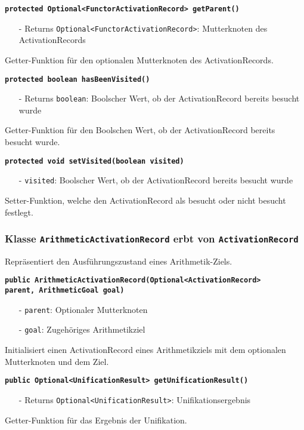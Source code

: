 \documentclass[parskip=full,11pt,twoside]{scrartcl}
\begin{document}
\textbf{\texttt{protected Optional<FunctorActivationRecord> getParent()}}
\begin{itemize}[noitemsep]
	\item[-] Returns \texttt{Optional<FunctorActivationRecord>}: Mutterknoten des ActivationRecords
\end{itemize}
Getter-Funktion für den optionalen Mutterknoten des ActivationRecords.

\textbf{\texttt{protected boolean hasBeenVisited()}}
\begin{itemize}[noitemsep]
	\item[-] Returns \texttt{boolean}: Boolscher Wert, ob der ActivationRecord bereits besucht wurde
\end{itemize}
Getter-Funktion für den Boolschen Wert, ob der ActivationRecord bereits besucht wurde.

\textbf{\texttt{protected void setVisited(boolean visited)}}
\begin{itemize}[noitemsep]
	\item[-] \texttt{visited}: Boolscher Wert, ob der ActivationRecord bereits besucht wurde
\end{itemize}
Setter-Funktion, welche den ActivationRecord als besucht oder nicht besucht festlegt.

\subsubsection{Klasse \texttt{ArithmeticActivationRecord} erbt von \texttt{ActivationRecord}}
Repräsentiert den Ausführungszustand eines Arithmetik-Ziels.

\textbf{\texttt{public ArithmeticActivationRecord(Optional<ActivationRecord>\\parent, ArithmeticGoal goal)}}
\begin{itemize}[noitemsep]
	\item[-] \texttt{parent}: Optionaler Mutterknoten
	\item[-] \texttt{goal}: Zugehöriges Arithmetikziel
\end{itemize}
Initialisiert einen ActivationRecord eines Arithmetikziels mit dem optionalen Mutterknoten und dem Ziel.

\textbf{\texttt{public Optional<UnificationResult> getUnificationResult()}}
\begin{itemize}[noitemsep]
	\item[-] Returns \texttt{Optional<UnificationResult>}: Unifikationsergebnis
\end{itemize}
Getter-Funktion für das Ergebnis der Unifikation.
\end{document}
